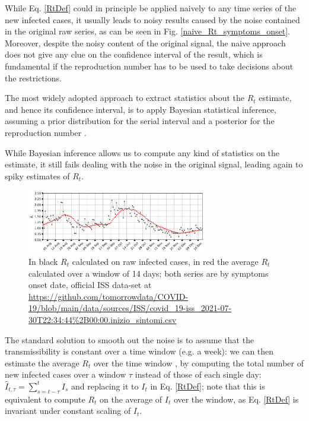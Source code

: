 \documentclass[graybox]{svmult}
\begin{document}
While Eq. \ref{RtDef} could in principle be applied naively to any time series of the new infected cases, it usually leads to noisy results caused by the noise contained in the original raw series, as can be seen in Fig. \ref{naive_Rt_symptoms_onset}. Moreover, despite the noisy content of the original signal, the naive approach does not give any clue on the confidence interval of the result, which is fundamental if the reproduction number has to be used to take decisions about the restrictions.

The most widely adopted approach to extract statistics about the $R_t$ estimate, and hence its confidence interval, is to apply Bayesian statistical inference, assuming a prior distribution for the serial interval and a posterior for the reproduction number \cite{CorietAl2013}. 

While Bayesian inference allows us to compute any kind of statistics on the estimate, it still fails  dealing with the noise in the original signal, leading again to spiky estimates of $R_t$.

\begin{figure}[t]
\center
\includegraphics[width=0.7\textwidth]{Rt_images/naive_Rt_symptoms_onset_window_14.jpg}
\caption{In black $R_t$ calculated on raw infected cases, in red the average $R_t$ calculated over a window of 14 days; both series are by symptoms onset date, official ISS data-set at \url{https://github.com/tomorrowdata/COVID-19/blob/main/data/sources/ISS/covid_19-iss_2021-07-30T22:34:44\%2B00:00.inizio_sintomi.csv}}
\label{naive_Rt_symptoms_onset_window_14}
\end{figure}

The standard solution to smooth out the noise is to assume that the transmissibility is constant over a time window (e.g. a week): we can then estimate the average $R_t$ over the time window \cite{CorietAl2013}, by computing the total number of new infected cases over a window $\tau$ instead of those of each single day: $\hat{I}_{t,\tau}=\sum_{s=t-\tau}^{t} I_s$ and replacing it to $I_t$ in Eq. \ref{RtDef}; note that this is equivalent to compute $R_t$ on the average of $I_t$ over the window, as Eq. \ref{RtDef} is invariant under constant scaling of $I_t$. 
\end{document}
